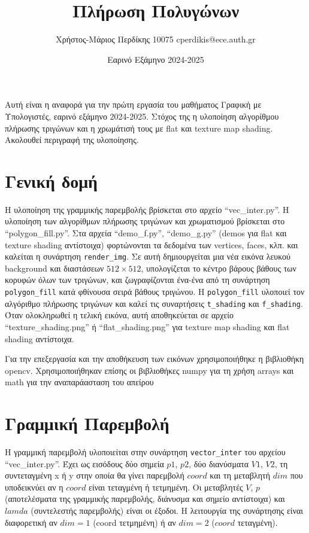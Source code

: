\documentclass{article}
\title{Πλήρωση Πολυγώνων}
\date{Εαρινό Εξάμηνο 2024-2025}
\author{Χρήστος-Μάριος Περδίκης 10075 cperdikis@ece.auth.gr}
\begin{document}
\maketitle

Αυτή είναι η αναφορά για την πρώτη εργασία του μαθήματος Γραφική με 
Υπολογιστές, εαρινό εξάμηνο 2024-2025. Στόχος της η υλοποίηση αλγορίθμου
πλήρωσης τριγώνων και η χρωμάτισή τους με flat και texture map
shading. Ακολουθεί περιγραφή της υλοποίησης.

\section{Γενική δομή}
Η υλοποίηση της γραμμικής παρεμβολής βρίσκεται στο αρχείο ``vec\_inter.py''.
Η υλοποίηση των αλγορίθμων πλήρωσης τριγώνων και χρωματισμού βρίσκεται
στο ``polygon\_fill.py''. Στα αρχεία ``demo\_f.py'', ``demo\_g.py'' (demos για flat και texture shading
αντίστοιχα) φορτώνονται τα δεδομένα των vertices, faces, κλπ. και καλείται η
συνάρτηση \verb|render_img|.  Σε αυτή δημιουργείται μια νέα εικόνα λευκού background
και δια\-στάσεων $512\times512$, υπολογίζεται το κέντρο βάρους βάθους των κορυφών
όλων των τριγώνων, και ζωγρα\-φίζονται ένα-ένα από τη συνάρτηση \verb|polygon_fill|
κατά φθίνουσα σειρά βάθους τριγώνου.  Η \verb|polygon_fill| υλοποιεί τον αλγόριθμο
πλήρωσης τριγώνων και καλεί τις συναρτήσεις \verb|t_shading| και
\verb|f_shading|. Όταν ολοκληρωθεί η τελική εικόνα, αυτή αποθηκεύεται σε αρχείο
``texture\_shading.png'' ή ``flat\_shading.png'' για texture map shading και flat shading αντίστοιχα.

Για την επεξεργασία και την αποθήκευση των εικόνων χρησιμοποιήθηκε η βιβλιοθήκη
opencv. Χρησιμο\-ποιήθηκαν επίσης οι βιβλιοθήκες numpy για τη χρήση arrays και
math για την αναπαράασταση του απείρου

\section{Γραμμική Παρεμβολή}
Η γραμμική παρεμβολή υλοποιείται στην συνάρτηση \verb|vector_inter| του αρχείου 
``vec\_inter.py''. Έχει ως εισόδους δύο σημεία $p1$, $p2$, δύο διανύσματα $V1$,
$V2$, τη συντεταγμένη x ή y στην οποία θα γίνει παρεμβολή $coord$ και τη μεταβλητή
$dim$ που υποδεικνύει αν η $coord$ είναι τεταγμένη ή τετμημένη. Οι μεταβλητές 
$V$, $p$ (αποτελέσματα της γραμμικής παρεμβολής, διάνυσμα και σημείο αντίστοιχα) και 
$lamda$ (συντελεστής παρεμβολής) είναι οι έξοδοι. Η λειτουργία της 
συνάρτησης είναι διαφορετική αν $dim = 1$ (coord τετμημένη) ή αν $dim = 2$ 
($coord$ τεταγμένη). 
\end{document}
